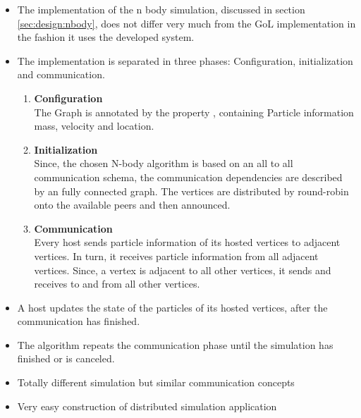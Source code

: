 \begin{itemize}
\item The implementation of the n body simulation, discussed in
  section \ref{sec:design:nbody}, does not differ very much from the
  GoL implementation in the fashion it uses the developed system.

\item The implementation is separated in three phases: Configuration, initialization
  and communication.

  \begin{enumerate}
  \item \textbf{Configuration}\\
    The Graph is annotated by the property , containing
    Particle information mass, velocity and location.

  \item \textbf{Initialization}\\
    Since, the chosen N-body algorithm is based on an all to all communication
    schema, the communication dependencies are described by an fully connected
    graph. The vertices are distributed by round-robin onto the available
    peers and then announced.

  \item \textbf{Communication}\\
    Every host sends particle information of its hosted vertices to
    adjacent vertices. In turn, it receives particle information from
    all adjacent vertices. Since, a vertex is adjacent to all other
    vertices, it sends and receives to and from all other vertices.
  \end{enumerate}

\item A host updates the state of the particles of its hosted
  vertices, after the communication has finished.

\item The algorithm repeats the communication phase
  until the simulation has finished or is canceled.

\item Totally different simulation but similar communication
  concepts

\item Very easy construction of distributed simulation application
  
\end{itemize}

